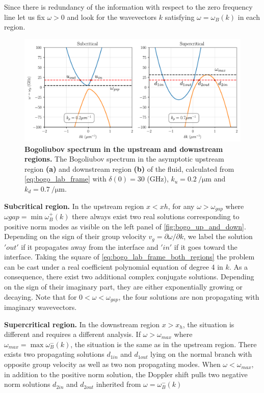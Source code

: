 \bigskip


Since there is redundancy of the information with respect to the zero frequency line let us fix $\omega>0$ and look for the wavevectors $k$ satisfying $\omega=\omega_B(k)$ in each region.
\begin{figure}
    \centering
    \includegraphics[width=1\textwidth]{chap_AG_theory/fig/bogo_gap_dispersion.pdf}
    \caption{\textbf{Bogoliubov spectrum in the upstream and downstream regions.} The Bogoliubov spectrum in the asymptotic upstream region \textbf{(a)} and downstream region \textbf{(b)} of the fluid, calculated from \autoref{eq:bogo_lab_frame} with $\delta(0)=30$ (GHz), $k_u= \SI{0.2}{\per \micro \meter}$ and
    $k_d=\SI{0.7}{\per\micro\meter}$.}
    \label{fig:bogo_up_and_down}
\end{figure}

\bigskip

\textbf{Subcritical region.} In the upstream region $x<xh$, for any $\omega>\omega_{gap}$ where $\omega{gap}=\min{\omega^+_B(k)}$ there always exist two real solutions corresponding to positive norm modes as visible on the left panel of \autoref{fig:bogo_up_and_down}. Depending
on the sign of their group velocity $v_g=\partial\omega/\partial k$, we label the solution $'out'$ if it propagates away from the interface and $'in'$ if it goes toward the interface. 
Taking the square of \autoref{eq:bogo_lab_frame_both_regions} the problem can be cast under a real coefficient polynomial equation of degree 4 in $k$. As a consequence,
there exist two additional complex conjugate solutions. Depending on the sign of their imaginary part, they are either exponentially growing or decaying. Note that for $0<\omega<\omega_{gap}$, the four solutions are non propagating with imaginary wavevectors.

\bigskip


\textbf{Supercritical region.} In the downstream region $x>x_h$, the situation is different and requires a different analysis. If $\omega>\omega_{max}$ where $\omega_{max}=\max{\omega^-_B(k)}$, the situation is the same as in the upstream 
region. There exists two propagating solutions $d_{1in}$ and $d_{1out}$ lying on the normal branch with opposite group velocity as well as two non propagating modes. When $\omega<\omega_{max}$, in addition to the positive norm solution, the Doppler shift pulls two negative norm solutions $d_{2in}$ and $d_{2out}$ inherited from $\omega=\omega^-_B(k)$

